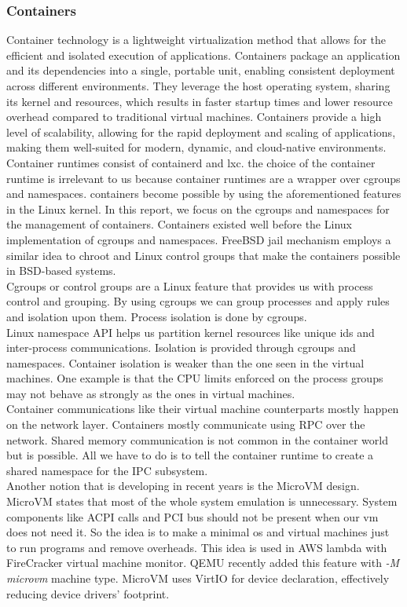 \documentclass[a4paper, 11pt, twocolumn]{article}
\theoremstyle{nonumberplain}
\begin{document}
\subsubsection{Containers}
Container technology is a lightweight virtualization method that allows for
the efficient and isolated execution of applications. Containers package
an application and its dependencies into a single, portable unit,
enabling consistent deployment across different environments.
They leverage the host operating system, sharing its kernel and
resources, which results in faster startup times and lower resource
overhead compared to traditional virtual machines. Containers provide
a high level of scalability, allowing for the rapid deployment and
scaling of applications, making them well-suited for modern, dynamic,
and cloud-native environments. \\
Container runtimes consist of containerd and lxc. the choice of the container
runtime is irrelevant to us because container runtimes are a wrapper over
cgroups and namespaces. containers become possible by using the aforementioned
features in the Linux kernel. In this report, we focus on the cgroups and
namespaces for the management of containers. Containers existed well before the
Linux implementation of cgroups and namespaces. FreeBSD jail mechanism employs
a similar idea to chroot and Linux control groups that make the containers
possible in BSD-based systems. \\
Cgroups or control groups are a Linux feature that provides us with process
control and grouping. By using cgroups we can group processes and apply rules
and isolation upon them. Process isolation is done by cgroups. \\
Linux namespace API helps us partition kernel resources like unique ids and
inter-process communications. Isolation is provided through cgroups and
namespaces. Container isolation is weaker than the one seen in the virtual
machines. One example is that the CPU limits enforced on the process groups
may not behave as strongly as the ones in virtual machines. \\
Container communications like their virtual machine counterparts
mostly happen on the network layer. Containers mostly communicate using
RPC over the network. Shared memory communication is not common in the container
world but is possible. All we have to do is to tell the container runtime
to create a shared namespace for the IPC subsystem. \\
Another notion that is developing in recent years is the MicroVM design.
MicroVM states that most of the whole system emulation is unnecessary. System
components like ACPI calls and PCI bus should not be present when our vm does
not need it. So the idea is to make a minimal os and virtual machines just to
run programs and remove overheads. This idea is used in AWS lambda with
FireCracker virtual machine monitor. QEMU recently added this feature with
\textit{-M microvm} machine type.
MicroVM uses VirtIO for device declaration, effectively reducing device drivers'
footprint.
\end{document}
